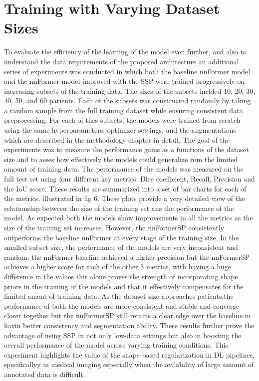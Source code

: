 \section{Training with Varying Dataset Sizes}
To evaluate the efficiency of the learning of the model even further, and also to understand the data requirements of the proposed architecture an additional series of experiments was conducted in which both the baseline nnFormer model and the nnFormer model improved with the SSP were trained progressively on increasing subsets of the training data. The sizes of the subsets inclded 10, 20, 30, 40, 50, and 60 patients. Each of the subsets was constructed randomly by taking a random sample from the full training dataset while ensuring consistent data preprocessing. For each of thes subsets, the models were trained from scratch using the same hyperparameters, optimizer settings, and the augmentations which are described in the methodology chapter in detail. The goal of the experiments was to measure the performance gains as a functions of the dataset size and to asses how effectively the models could generalize rom the limited amount of training data. The performance of the models was measured on the full test set using four different key metrics: Dice coefficient, Recall, Precision and the IoU score. These results are summarized into a set of bar charts for each of the metrics, illustrated in fig 6. These plots provide a very detailed view of the relationship between the size of the training set ans the performance of the model. As expected both the models show improvements in all the metrics as the size of the training set increases. However, the nnFormerSP consistently outperforms the baseline nnFormer at every stage of the training size. In the smalled subset size, the performance of the models are very inconsistent and random, the nnFormer baseline achieved a higher precision but the nnFormerSP achieves a higher score for each of the other 3 metrics, with having a huge difference in the values this alone proves the strength of incorporating shape priors in the training of the models and that it effectively compensates for the limited amont of training data. As the dataset size approaches  patients,the performance of both the models are more consistent and stable and converge closer together but the nnFormerSP still retains a clear edge over the baseline in havin better consistency and segmentation ability. These results further prove the advantage of using SSP in not only low-data settings but also in boosting the overall performance of the model across varying training conditions. This experiment highlights the value of the shape-based regularization in DL pipelines, specificallyy in medical imaging especially when the avilability of large amount of annotated data is difficult.

